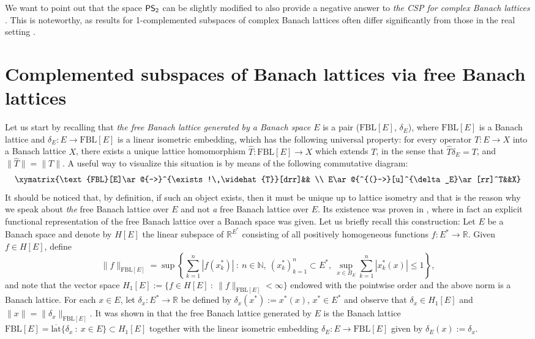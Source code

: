 \documentclass[11pt]{amsart}
\theoremstyle{definition}
\numberwithin{equation}{section}
\newcommand{\fbl}{\text{FBL}}
\newcommand\PS{{\normalfont\textsf{PS}}_\textsf{2}}
\begin{document}
We want to point out that the space $\PS$ can be slightly modified to also provide a negative answer to \textit{the CSP for complex Banach lattices} \cite[Section 5]{dHMST23}. This is noteworthy, as results for 1-complemented subspaces of complex Banach lattices often differ significantly from those in the real setting \cite{DKL, Kalton(Dales), KW}.

\section{Complemented subspaces of Banach lattices via free Banach lattices}\label{sec:FBLs}

Let us start by recalling that \textit{the free Banach lattice generated by a Banach space $E$} is a pair ($\fbl[E]$, $\delta_E$), where $\fbl[E]$ is a Banach lattice and $\delta_E:E\to \fbl[E]$ is a linear isometric embedding, which has the following universal property: for every operator $T:E\to X$ into a Banach lattice $X$, there exists a unique lattice homomorphism $\widehat{T}:\fbl[E]\to X$ which extends $T$, in the sense that $\widehat{T}\delta_E=T$, and $\|\widehat{T}\|=\|T\|$. A useful way to visualize this situation is by means of the following commutative diagram:
$$
	\xymatrix{\fbl[E]\ar@{-->}^{\exists!\,\widehat{T}}[drr]&& \\
	E\ar@{^{(}->}[u]^{\delta_E}\ar[rr]^T&&X}
$$
It should be noticed that, by definition, if such an object exists, then it must be unique up to lattice isometry and that is the reason why we speak about \textit{the} free Banach lattice over $E$ and not \textit{a} free Banach lattice over $E$. Its existence was proven in \cite{ART18}, where in fact an explicit functional representation of the free Banach lattice over a Banach space was given. Let us briefly recall this construction: Let $E$ be a Banach space and denote by $H[E]$ the linear subspace of $\mathbb{R}^{E^*}$ consisting of all positively homogeneous functions $f:E^*\to\mathbb{R}$. Given $f\in H[E]$, define
$$
\|f\|_{\fbl[E]}=\sup\left\{\sum_{k=1}^n |f(x_k^*)|\::\:n\in\mathbb{N}, \:(x_k^*)_{k=1}^n\subset E^*,\:\sup_{x\in B_E}\sum_{k=1}^n|x_k^*(x)|\leq 1\right\},
$$
and note that the vector space $H_1[E]:=\{f\in H[E]\::\: \|f\|_{\fbl[E]}<\infty\}$ endowed with the pointwise order and the above norm is a Banach lattice. For each $x\in E$, let $\delta_x:E^*\to\mathbb{R}$ be defined by $\delta_x(x^*):=x^*(x)$, $x^*\in E^*$ and observe that $\delta_x\in H_1[E]$ and $\|x\|=\|\delta_x\|_{\fbl[E]}$. It was shown in \cite{ART18} that the free Banach lattice generated by $E$ is the Banach lattice $\fbl[E]=\overline{\text{lat}}\{\delta_x\::\:x\in E\}\subset H_1[E]$ together with the linear isometric embedding $\delta_E:E\to\fbl[E]$ given by $\delta_E(x):=\delta_x$.
\end{document}
